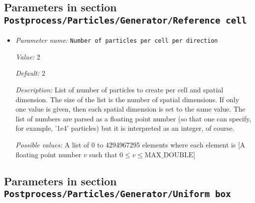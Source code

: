 \subsection{Parameters in section \tt Postprocess/Particles/Generator/Reference cell}
\label{parameters:Postprocess/Particles/Generator/Reference_20cell}

\begin{itemize}
\item {\it Parameter name:} {\tt Number of particles per cell per direction}
\label{parameters:Postprocess/Particles/Generator/Reference cell/Number of particles per cell per direction}


{\it Value:} 2


{\it Default:} 2


{\it Description:} List of number of particles to create per cell and spatial dimension. The size of the list is the number of spatial dimensions. If only one value is given, then each spatial dimension is set to the same value. The list of numbers are parsed as a floating point number (so that one can specify, for example, '1e4' particles) but it is interpreted as an integer, of course.


{\it Possible values:} A list of 0 to 4294967295 elements where each element is [A floating point number $v$ such that $0 \leq v \leq \text{MAX\_DOUBLE}$]
\end{itemize}

\subsection{Parameters in section \tt Postprocess/Particles/Generator/Uniform box}
\label{parameters:Postprocess/Particles/Generator/Uniform_20box}

